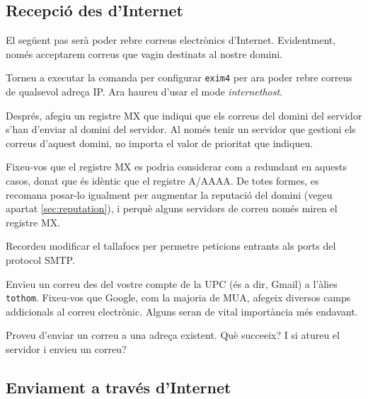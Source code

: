 \documentclass{practicaitic}
\begin{document}
\subsection{Recepció des d'Internet}

El següent pas serà poder rebre correus electrònics d'Internet. Evidentment,
només acceptarem correus que vagin destinats al nostre domini.

\begin{previ}
  Torneu a executar la comanda per configurar \texttt{exim4} per ara poder
  rebre correus de qualsevol adreça IP. Ara haureu d'usar el mode
  \textit{internethost}.

  Després, afegiu un registre MX que indiqui que els correus del domini
  del servidor s'han d'enviar al domini del servidor. Al només tenir un
  servidor que gestioni els correus d'aquest domini, no importa el valor
  de prioritat que indiqueu.

  Fixeu-vos que el registre MX es podria considerar com a redundant en aquests
  casos, donat que és idèntic que el registre A/AAAA. De totes formes, es
  recomana posar-lo igualment per augmentar la reputació del domini
  (vegeu apartat \ref{sec:reputation}), i perquè alguns servidors de
  correu només miren el registre MX.
\end{previ}

Recordeu modificar el tallafocs per permetre peticions entrants als ports
del protocol SMTP.

\begin{tasca}
  Envieu un correu des del vostre compte de la UPC (és a dir, Gmail) a
  l'àlies \texttt{tothom}. Fixeu-vos que Google, com la majoria de
  MUA, afegeix diversos camps addicionals al correu electrònic. Alguns
  seran de vital importància més endavant.

  Proveu d'enviar un correu a una adreça existent. Què succeeix? I si
  atureu el servidor i envieu un correu?
\end{tasca}



\subsection{Enviament a través d'Internet}
\end{document}
